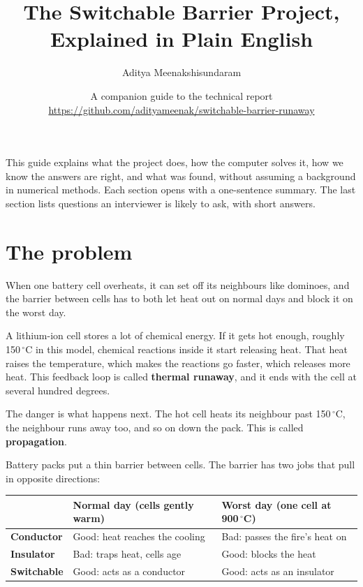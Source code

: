 \documentclass[11pt]{article}
\title{The Switchable Barrier Project, Explained in Plain English}
\author{Aditya Meenakshisundaram}
\date{A companion guide to the technical report \\[2pt]
\small\url{https://github.com/adityameenak/switchable-barrier-runaway}}
\begin{document}
\maketitle

\noindent This guide explains what the project does, how the computer solves it, how
we know the answers are right, and what was found, without assuming a background in
numerical methods. Each section opens with a one-sentence summary. The last section
lists questions an interviewer is likely to ask, with short answers.

\tableofcontents

\section{The problem}

\begin{idea}
When one battery cell overheats, it can set off its neighbours like dominoes, and the
barrier between cells has to both let heat out on normal days and block it on the
worst day.
\end{idea}

A lithium-ion cell stores a lot of chemical energy. If it gets hot enough, roughly
150\,$^\circ$C in this model, chemical reactions inside it start releasing heat. That heat
raises the temperature, which makes the reactions go faster, which releases more heat.
This feedback loop is called \textbf{thermal runaway}, and it ends with the cell at
several hundred degrees.

The danger is what happens next. The hot cell heats its neighbour past 150\,$^\circ$C, the
neighbour runs away too, and so on down the pack. This is called
\textbf{propagation}.

Battery packs put a thin barrier between cells. The barrier has two jobs that pull in
opposite directions:

\begin{center}
\begin{tabular}{@{}lll@{}}
\toprule
 & \textbf{Normal day} (cells gently warm) & \textbf{Worst day} (one cell at 900\,$^\circ$C) \\
\midrule
\textbf{Conductor}  & Good: heat reaches the cooling  & Bad: passes the fire's heat on \\
\textbf{Insulator}  & Bad: traps heat, cells age      & Good: blocks the heat \\
\textbf{Switchable} & Good: acts as a conductor       & Good: acts as an insulator \\
\bottomrule
\end{tabular}
\end{center}
\end{document}
